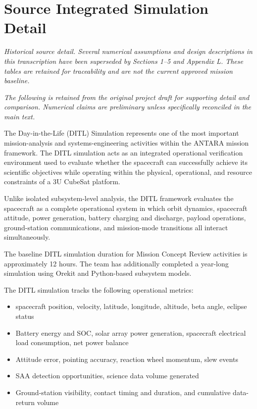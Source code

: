 \section{Source Integrated Simulation Detail}\label{app:source-04}
\noindent\textit{Historical source detail. Several numerical assumptions and design descriptions in this transcription have been superseded by Sections 1--5 and Appendix L. These tables are retained for traceability and are not the current approved mission baseline.}

\noindent\textit{The following is retained from the original project draft for supporting detail and comparison. Numerical claims are preliminary unless specifically reconciled in the main text.}

The Day-in-the-Life (DITL) Simulation represents one of the most
important mission-analysis and systems-engineering activities within the
ANTARA mission framework. The DITL simulation acts as an integrated
operational verification environment used to evaluate whether the
spacecraft can successfully achieve its scientific objectives while
operating within the physical, operational, and resource constraints of
a 3U CubeSat platform.

Unlike isolated subsystem-level analysis, the DITL framework evaluates
the spacecraft as a complete operational system in which orbit dynamics,
spacecraft attitude, power generation, battery charging and discharge,
payload operations, ground-station communications, and mission-mode
transitions all interact simultaneously.

The baseline DITL simulation duration for Mission Concept Review
activities is approximately 12 hours. The team has additionally
completed a year-long simulation using Orekit and Python-based subsystem
models.

The DITL simulation tracks the following operational metrics:

\begin{itemize}
\item
  spacecraft position, velocity, latitude, longitude, altitude, beta
  angle, eclipse status
\item
  Battery energy and SOC, solar array power generation, spacecraft
  electrical load consumption, net power balance
\item
  Attitude error, pointing accuracy, reaction wheel momentum, slew
  events
\item
  SAA detection opportunities, science data volume generated
\item
  Ground-station visibility, contact timing and duration, and cumulative
  data-return volume
\end{itemize}

